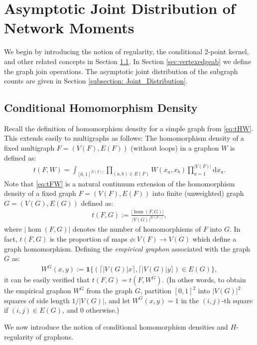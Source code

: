 \documentclass[11pt,reqno]{amsart}
\numberwithin{equation}{section}
\theoremstyle{definition}
\begin{document}
\section{Asymptotic Joint Distribution of Network Moments} 
\label{sec:distributionH}


We begin by introducing the notion of regularity, the conditional 2-point kernel, and other related concepts in Section \ref{subsection: Hom_and_Cond_Hom}. In Section \ref{sec:vertexedgeab} we define the graph join operations. The asymptotic joint distribution of the subgraph counts are given in Section \ref{subsection: Joint_Distribution}. 


\subsection{Conditional Homomorphism Density}\label{subsection: Hom_and_Cond_Hom}


Recall the definition of homomorphism density for a simple graph from \eqref{eq:tHW}. This extends easily to multigraphs as follows: The homomorphism density of a fixed multigraph $F=(V(F), E(F))$ (without loops) in a graphon $W$ is defined as: 
\begin{align}\label{eq:tFW}
t(F,W)=\int_{[0,1]^{|V(F)|}}\prod_{(a, b) \in E(F)}W(x_{a},x_{b})\prod_{a=1}^{|V(F)|}\mathrm{d} x_{a}. 
\end{align}
Note that \eqref{eq:tFW} is a natural continuum extension of the homomorphism density of a  fixed graph $F=(V(F), E(F))$ into  finite (unweighted) graph $G=(V(G), E(G))$ defined as: 
\begin{align}\label{eq:tFG}
t(F, G) :=\frac{|\hom(F,G)|}{|V (G)|^{|V (F)|}},
\end{align}
where  $|\hom(F,G)|$ denotes the number of homomorphisms of $F$ into $G$. In fact, $t(F, G)$ is the proportion of maps $\phi: V (F) \rightarrow V (G)$ which define a graph homomorphism. Defining the {\it empirical graphon} associated with the graph $G$ as: 
\begin{align}\label{eq:emp_graph}
	W^G(x, y) :=\boldsymbol 1\{(\lceil |V(G)|x \rceil, \lceil |V(G)|y \rceil)\in E(G)\} , 
\end{align} 
it can be easily verified that $t(F,G) = t(F, W^{G})$. 
(In other words, to obtain the empirical graphon $W^G$ from the graph $G$, partition $[0, 1]^2$ into $|V(G)|^2$ squares of side length $1/|V(G)|$, and let $W^G(x, y)=1$ in the $(i, j)$-th square if $(i, j)\in E(G)$, and 0 otherwise.) 


We now introduce the notion of conditional homomorphism densities and $H$-regularity of graphons. 
\end{document}
